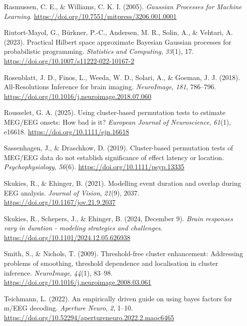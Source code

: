 \documentclass[
  doc,
  floatsintext,
  longtable,
  a4paper,
  nolmodern,
  notxfonts,
  notimes,
  colorlinks=true,linkcolor=blue,citecolor=blue,urlcolor=blue]{apa7}
\newlength{\cslhangindent}
\newenvironment{CSLReferences}[2] %
 {\begin{list}{}{%
  \setlength{\itemindent}{0pt}
  \setlength{\leftmargin}{0pt}
  \setlength{\parsep}{0pt}
  \ifodd #1
   \setlength{\leftmargin}{\cslhangindent}
   \setlength{\itemindent}{-1\cslhangindent}
  \fi
  \setlength{\itemsep}{#2\baselineskip}}}
 {\end{list}}
\begin{document}
\begin{CSLReferences}{1}{0}
Rasmussen, C. E., \& Williams, C. K. I. (2005). \emph{Gaussian Processes
for Machine Learning}.
\url{https://doi.org/10.7551/mitpress/3206.001.0001}

Riutort-Mayol, G., Bürkner, P.-C., Andersen, M. R., Solin, A., \&
Vehtari, A. (2023). Practical {Hilbert} space approximate {Bayesian
Gaussian} processes for probabilistic programming. \emph{Statistics and
Computing}, \emph{33}(1), 17.
\url{https://doi.org/10.1007/s11222-022-10167-2}

Rosenblatt, J. D., Finos, L., Weeda, W. D., Solari, A., \& Goeman, J. J.
(2018). All-Resolutions Inference for brain imaging. \emph{NeuroImage},
\emph{181}, 786--796.
\url{https://doi.org/10.1016/j.neuroimage.2018.07.060}

Rousselet, G. A. (2025). Using cluster-based permutation tests to
estimate {MEG}/{EEG} onsets: {How} bad is it? \emph{European Journal of
Neuroscience}, \emph{61}(1), e16618.
\url{https://doi.org/10.1111/ejn.16618}

Sassenhagen, J., \& Draschkow, D. (2019). Cluster{-}based permutation
tests of MEG/EEG data do not establish significance of effect latency or
location. \emph{Psychophysiology}, \emph{56}(6).
\url{https://doi.org/10.1111/psyp.13335}

Skukies, R., \& Ehinger, B. (2021). Modelling event duration and overlap
during {EEG} analysis. \emph{Journal of Vision}, \emph{21}(9), 2037.
\url{https://doi.org/10.1167/jov.21.9.2037}

Skukies, R., Schepers, J., \& Ehinger, B. (2024, December 9).
\emph{Brain responses vary in duration - modeling strategies and
challenges}. \url{https://doi.org/10.1101/2024.12.05.626938}

Smith, S., \& Nichols, T. (2009). Threshold-free cluster enhancement:
Addressing problems of smoothing, threshold dependence and localisation
in cluster inference. \emph{NeuroImage}, \emph{44}(1), 83--98.
\url{https://doi.org/10.1016/j.neuroimage.2008.03.061}

Teichmann, L. (2022). An empirically driven guide on using bayes factors
for m/EEG decoding. \emph{Aperture Neuro}, \emph{2}, 1--10.
\url{https://doi.org/10.52294/apertureneuro.2022.2.maoc6465}


\end{CSLReferences}
\end{document}
